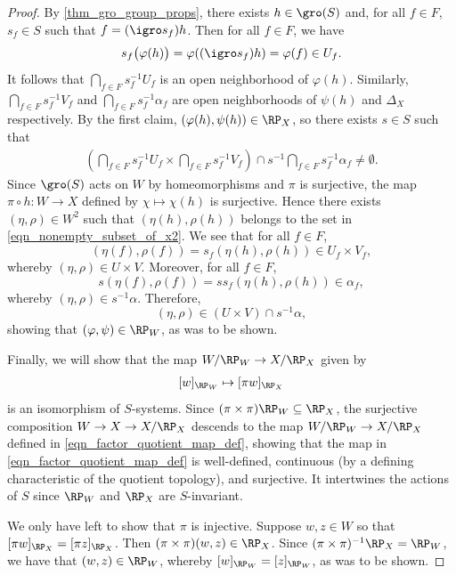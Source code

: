 \begin{proof}
    By \cref{thm_gro_group_props}, there exists $h \in \gro(S)$ and, for all $f \in F$, $s_f \in S$ such that $f = (\igro s_f) h$.
    Then for all $f \in F$, we have 
    \[
        s_f \big(\varphi(h)\big) = \varphi((\igro s_f) h) = \varphi (f) \in U_f.
    \]
    It follows that $\bigcap_{f \in F} s_f^{-1} U_f$ is an open neighborhood of $\varphi(h)$.
    Similarly, $\bigcap_{f \in F} s_f^{-1} V_f$ and $\bigcap_{f \in F} s_f^{-1} \alpha_f$ are open neighborhoods of $\psi(h)$ and $\Delta_X$ respectively. By the first claim, $(\varphi(h), \psi(h)) \in \RP_X$, so there exists $s \in S$ such that
    \begin{align}
        \label{eqn_nonempty_subset_of_x2}
        \left( \bigcap_{f \in F} s_f^{-1} U_f \times \bigcap_{f \in F} s_f^{-1} V_f \right) \cap s^{-1} \bigcap_{f \in F} s_f^{-1} \alpha_f \neq \emptyset.
    \end{align}
    Since $\gro(S)$ acts on $W$ by homeomorphisms and $\pi$ is surjective, the map $\pi \circ h: W \to X$ defined by $\chi \mapsto \chi(h)$ is surjective.  Hence there exists $(\eta, \rho) \in W^2$ such that $(\eta(h), \rho(h))$ belongs to the set in \eqref{eqn_nonempty_subset_of_x2}. We see that for all $f \in F$,
    \[(\eta(f), \rho(f)) = s_f (\eta(h), \rho(h)) \in U_f \times V_f,\]
    whereby $(\eta,\rho) \in U \times V$. Moreover, for all $f \in F$,
    \[s (\eta(f), \rho(f)) = s s_f (\eta(h), \rho(h)) \in \alpha_f,\]
    whereby $(\eta, \rho) \in s^{-1} \alpha$.
    Therefore,
    \[(\eta, \rho) \in (U \times V) \cap s^{-1} \alpha,\]
    showing that $(\varphi,\psi) \in \RP_W$, as was to be shown.

    Finally, we will show that the map $W/ \RP_W \to X / \RP_X$ given by 
    \begin{align}
    \label{eqn_factor_quotient_map_def}
        [w]_{\RP_W} \mapsto [\pi w]_{\RP_X}
    \end{align}
    is an isomorphism of $S$-systems.  Since $(\pi \times \pi) \RP_W \subseteq \RP_X$, the surjective composition $W \to X \to X/\RP_X$ descends to the map $W / \RP_W \to X / \RP_X$ defined in \eqref{eqn_factor_quotient_map_def}, showing that the map in \eqref{eqn_factor_quotient_map_def} is well-defined, continuous (by a defining characteristic of the quotient topology), and surjective.
    It intertwines the actions of $S$ since $\RP_W$ and $\RP_X$ are $S$-invariant.

    We only have left to show that $\pi$ is injective.  Suppose $w, z \in W$ so that $[\pi w]_{\RP_X} = [\pi z]_{\RP_X}$.  Then $(\pi \times \pi) (w,z) \in \RP_X$.  Since $(\pi \times \pi)^{-1} \RP_X = \RP_W$, we have that $(w,z) \in \RP_W$, whereby $[w]_{\RP_W} = [z]_{\RP_W}$, as was to be shown.
\end{proof}

